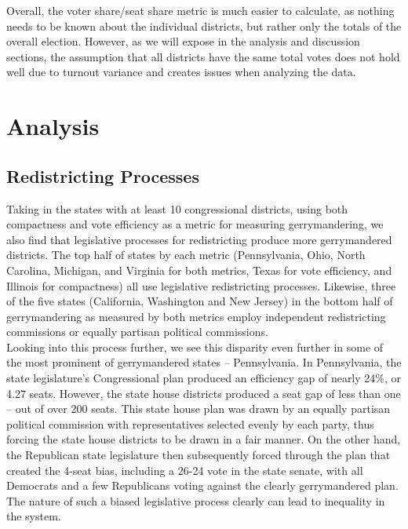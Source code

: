 \documentclass[12pt]{article}
\begin{document}
  Overall, the voter share/seat share metric is much easier to calculate, as nothing needs to be known about the individual districts, but rather only the totals of the overall election.  However, as we will expose in the analysis and discussion sections, the assumption that all districts have the same total votes does not hold well due to turnout variance and creates issues when analyzing the data.\\
  

  \section{Analysis}
  
 \subsection{Redistricting Processes}
Taking in the states with at least 10 congressional districts, using both compactness and vote efficiency as a metric for measuring gerrymandering, we also find that legislative processes for redistricting produce more gerrymandered districts. The top half of states by each metric (Pennsylvania, Ohio, North Carolina, Michigan, and Virginia for both metrics, Texas for vote efficiency, and Illinois for compactness) all use legislative redistricting processes.  Likewise, three of the five states (California, Washington and New Jersey) in the bottom half of gerrymandering as measured by both metrics employ independent redistricting commissions or equally partisan political commissions.\\
Looking into this process further, we see this disparity even further in some of the most prominent of gerrymandered states -- Pennsylvania.  In Pennsylvania, the state legislature's Congressional plan produced an efficiency gap of nearly 24\%, or 4.27 seats.  However, the state house districts produced a seat gap of less than one -- out of over 200 seats.  This state house plan was drawn by an equally partisan political commission with representatives selected evenly by each party, thus forcing the state house districts to be drawn in a fair manner.  On the other hand, the Republican state legislature then subsequently forced through the plan that created the 4-seat bias, including a 26-24 vote in the state senate, with all Democrats and a few Republicans voting against the clearly gerrymandered plan.  The nature of such a biased legislative process clearly can lead to inequality in the system.  \\
\end{document}
